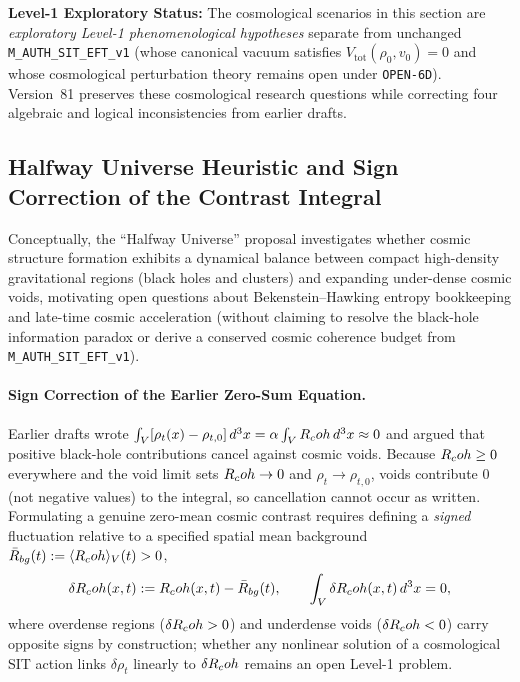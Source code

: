 \textbf{Level-1 Exploratory Status:} The cosmological scenarios in this section are \emph{exploratory Level-1 phenomenological hypotheses} separate from unchanged \texttt{M\_AUTH\_SIT\_EFT\_v1} (whose canonical vacuum satisfies $V_{\mathrm{tot}}(\rho_0, v_0) = 0$ and whose cosmological perturbation theory remains open under \texttt{OPEN-6D}). Version~81 preserves these cosmological research questions while correcting four algebraic and logical inconsistencies from earlier drafts.

\subsection{Halfway Universe Heuristic and Sign Correction of the Contrast Integral}

Conceptually, the ``Halfway Universe'' proposal investigates whether cosmic structure formation exhibits a dynamical balance between compact high-density gravitational regions (black holes and clusters) and expanding under-dense cosmic voids, motivating open questions about Bekenstein--Hawking entropy bookkeeping and late-time cosmic acceleration (without claiming to resolve the black-hole information paradox or derive a conserved cosmic coherence budget from \texttt{M\_AUTH\_SIT\_EFT\_v1}).

\paragraph{Sign Correction of the Earlier Zero-Sum Equation.}
Earlier drafts wrote $\int_{V}[\rho_t(x) - \rho_{t,0}]\,d^3x = \alpha\int_{V}R_coh\,d^3x \approx 0$ and argued that positive black-hole contributions cancel against cosmic voids. Because $R_coh \ge 0$ everywhere and the void limit sets $R_coh \to 0$ and $\rho_t \to \rho_{t,0}$, voids contribute $0$ (not negative values) to the integral, so cancellation cannot occur as written. Formulating a genuine zero-mean cosmic contrast requires defining a \emph{signed} fluctuation relative to a specified spatial mean background $\bar{R}_{bg}(t) := \langle R_coh\rangle_{V}(t) > 0$,
\begin{equation}
\delta R_coh(x, t) := R_coh(x, t) - \bar{R}_{bg}(t),
\qquad
\int_{V} \delta R_coh(x, t)\,d^3x = 0,
\label{eq:signed_cosmic_contrast}
\end{equation}
where overdense regions ($\delta R_coh > 0$) and underdense voids ($\delta R_coh < 0$) carry opposite signs by construction; whether any nonlinear solution of a cosmological SIT action links $\delta\rho_t$ linearly to $\delta R_coh$ remains an open Level-1 problem.

